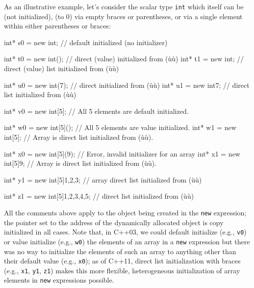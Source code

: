 As an illustrative example, let's consider the scalar type \lstinline!int!
which itself can be  (not initialized),
 (to 0) via empty braces or parentheses, or
 via a single element within either
parentheses or braces:

\begin{emcppslisting}
int* s0  = new int;               // default initialized (no initializer)

int* t0 = new int();              // direct (value) initialized from (ù{\codeincomments{()}}ù)
int* t1 = new int{};              // direct (value) list initialized from (ù{\codeincomments{\{\}}}ù)

int* u0 = new int(7);             // direct initialized from (ù{}ù)
int* u1 = new int{7};             // direct list initialized from (ù{}ù)

int* v0 = new int[5];             // All 5 elements are default initialized.

int* w0 = new int[5]();           // All 5 elements are value initialized.
int* w1 = new int[5]{};           // Array is direct list initialized from (ù{\codeincomments{\{\}}}ù).

int* x0 = new int[5](9);          // Error, invalid initializer for an array
int* x1 = new int[5]{9};          // Array is direct list initialized from (ù{}ù).

int* y1 = new int[5]{1,2,3};      // array direct list initialized from (ù{}ù)

int* z1 = new int[5]{1,2,3,4,5};  // direct list initialized from (ù{}ù)
\end{emcppslisting}


\noindent All the comments above apply to the object being created in the
\lstinline!new! expression; the pointer set to the address of the
dynamically allocated object is copy initialized in all cases. Note
that, in C++03, we could default initialize (e.g., \lstinline!v0!) or value
initialize (e.g., \lstinline!w0!) the elements of an array in a
\lstinline!new! expression but there was no way to initialize the elements
of such an array to anything other than their default value (e.g.,
\lstinline!x0!); as of C++11, direct list initialization with braces (e.g.,
\lstinline!x1!, \lstinline!y1!, \lstinline!z1!) makes this more flexible,
heterogeneous initialization of array elements in \lstinline!new!
expressions possible.

